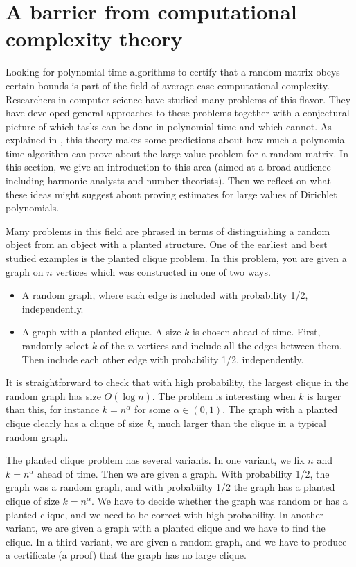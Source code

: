 \documentclass{amsart}
\begin{document}
\section{A barrier from computational complexity theory} \label{secbarrierlowdeg}

Looking for polynomial time algorithms to certify that a random matrix obeys certain bounds is part of the field of average case computational complexity.  Researchers in computer science have studied many problems of this flavor.  They have developed general approaches to these problems together with a conjectural picture of which tasks can be done in polynomial time and which cannot.  As explained in \cite{DHPT}, this theory makes some predictions about how much a polynomial time algorithm can prove about the large value problem for a random matrix.  In this section, we give an introduction to this area (aimed at a broad audience including harmonic analysts and number theorists).  Then we reflect on what these ideas might suggest about proving estimates for large values of Dirichlet polynomials.

Many problems in this field are phrased in terms of distinguishing a random object from an object with a planted structure.  One of the earliest and best studied examples is the planted clique problem.  In this problem, you are given a graph on $n$ vertices which was constructed in one of two ways.

\begin{itemize}

\item A random graph, where each edge is included with probability 1/2, independently.

\item A graph with a planted clique.  A size $k$ is chosen ahead of time.  First, randomly select $k$ of the $n$ vertices and include all the edges between them.  Then include each other edge with probability 1/2, independently.

\end{itemize}

It is straightforward to check that with high probability, the largest clique in the random graph has size $O(\log n)$.  The problem is interesting when $k$ is larger than this, for instance $k = n^\alpha$ for some $\alpha \in (0,1)$.  The graph with a planted clique clearly has a clique of size $k$, much larger than the clique in a typical random graph.

The planted clique problem has several variants.   In one variant,  we fix $n$ and $k = n^\alpha$ ahead of time.   Then we are given a graph.   With probability 1/2, the graph was a random graph, and with probabiilty 1/2 the graph has a planted clique of size $k = n^\alpha$.   We have to decide whether the graph was random or has a planted clique, and we need to be correct with high probability.   In another variant,  we are given a graph with a planted clique and we have to find the clique.  In a third variant,  we are given a random graph, and we have to produce a certificate (a proof) that the graph has no large clique.  
\end{document}
